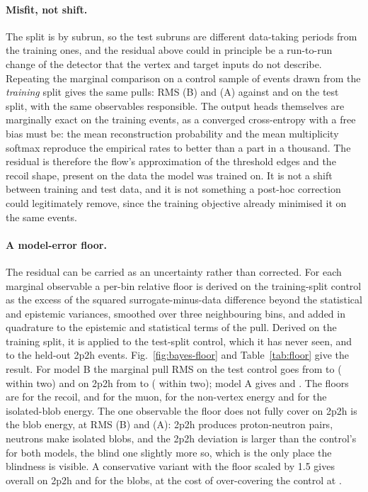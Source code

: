 \documentclass[11pt]{article}
\begin{document}
\paragraph{Misfit, not shift.} The split is by subrun, so the test subruns are different data-taking periods from
the training ones, and the residual above could in principle be a run-to-run change of the detector that the
vertex and target inputs do not describe. Repeating the marginal comparison on a control sample of
\nBayBnCtl{} events drawn from the \emph{training} split gives the same pulls: RMS \nBayBTrnMargPullRMS{} (B)
and \nBayATrnMargPullRMS{} (A) against \nBayBCtlMargPullRMS{} and \nBayACtlMargPullRMS{} on the test split,
with the same observables responsible. The output heads themselves are marginally exact on the training events,
as a converged cross-entropy with a free bias must be: the mean reconstruction probability and the mean
multiplicity softmax reproduce the empirical rates to better than a part in a thousand. The residual is
therefore the flow's approximation of the threshold edges and the recoil shape, present on the data the model
was trained on. It is not a shift between training and test data, and it is not something a post-hoc
correction could legitimately remove, since the training objective already minimised it on the same events.

\paragraph{A model-error floor.} The residual can be carried as an uncertainty rather than corrected. For each
marginal observable a per-bin relative floor is derived on the training-split control as the excess of the
squared surrogate-minus-data difference beyond the statistical and epistemic variances, smoothed over three
neighbouring bins, and added in quadrature to the epistemic and statistical terms of the pull. Derived on the
training split, it is applied to the test-split control, which it has never seen, and to the held-out 2p2h
events. Fig.~\ref{fig:bayes-floor} and Table~\ref{tab:floor} give the result. For model B the marginal pull RMS
on the test control goes from \nBayBCtlMargPullRMS{} to \nFloorBRmsCtlRMS{} (\nFloorBRmsCtlWithin{} within two)
and on 2p2h from \nBayBOODMargPullRMS{} to \nFloorBRmsOODRMS{} (\nFloorBRmsOODWithin{} within two); model A gives
\nFloorARmsCtlRMS{} and \nFloorARmsOODRMS{}. The floors are \nFloorBRmsRecoilPct{} for the recoil,
\nFloorBRmsMuPPct{} and \nFloorBRmsDthxPct{} for the muon, \nFloorBRmsNvtxPct{} for the non-vertex energy and
\nFloorBRmsBlobsPct{} for the isolated-blob energy. The one observable the floor does not fully cover on 2p2h is
the blob energy, at RMS \nFloorBRmsBlobsOOD{} (B) and \nFloorARmsBlobsOOD{} (A): 2p2h produces proton-neutron
pairs, neutrons make isolated blobs, and the 2p2h deviation is larger than the control's for both models, the
blind one slightly more so, which is the only place the blindness is visible. A conservative variant with the
floor scaled by 1.5 gives \nFloorBConsOODRMS{} overall on 2p2h and \nFloorBConsBlobsOOD{} for the blobs, at the
cost of over-covering the control at \nFloorBConsCtlRMS{}.
\end{document}
